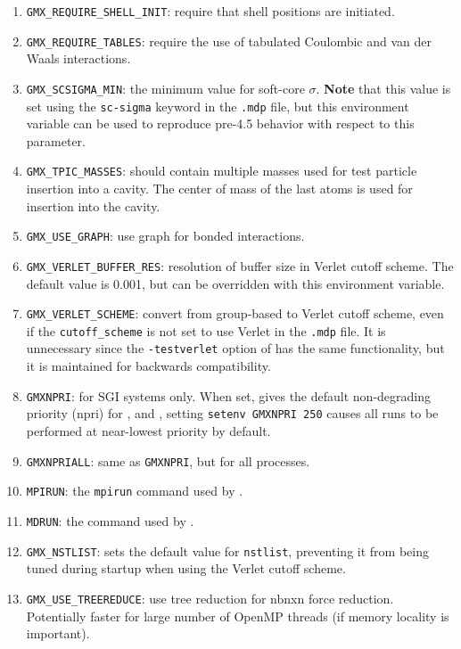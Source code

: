 \begin{enumerate}
\item   {\tt GMX_REQUIRE_SHELL_INIT}: require that shell positions are initiated.
\item   {\tt GMX_REQUIRE_TABLES}: require the use of tabulated Coulombic
        and van der Waals interactions.
\item   {\tt GMX_SCSIGMA_MIN}: the minimum value for soft-core $\sigma$. {\bf Note} that this value is set
        using the {\tt sc-sigma} keyword in the {\tt .mdp} file, but this environment variable can be used
        to reproduce pre-4.5 behavior with respect to this parameter.
\item   {\tt GMX_TPIC_MASSES}: should contain multiple masses used for test particle insertion into a cavity.
        The center of mass of the last atoms is used for insertion into the cavity.
\item   {\tt GMX_USE_GRAPH}: use graph for bonded interactions.
\item   {\tt GMX_VERLET_BUFFER_RES}: resolution of buffer size in Verlet cutoff scheme.  The default value is
        0.001, but can be overridden with this environment variable.
\item   {\tt GMX_VERLET_SCHEME}: convert from group-based to Verlet cutoff scheme, even if the {\tt cutoff_scheme} is
        not set to use Verlet in the {\tt .mdp} file. It is unnecessary since the {\tt -testverlet} option of
        {\tt {}} has the same functionality, but it is maintained for backwards compatibility.
\item   {\tt GMXNPRI}: for SGI systems only. When set, gives the default non-degrading priority (npri) 
        for {\tt {}}, {\tt {}} and {\tt {}},
        {\eg} setting {\tt setenv GMXNPRI 250} causes all runs to be performed at near-lowest priority by default.
\item   {\tt GMXNPRIALL}: same as {\tt GMXNPRI}, but for all processes.
\item   {\tt MPIRUN}: the {\tt mpirun} command used by {\tt {}}.
\item   {\tt MDRUN}: the {\tt {}} command used by {\tt {}}.
\item   {\tt GMX_NSTLIST}: sets the default value for {\tt nstlist}, preventing it from being tuned during
        {\tt {}} startup when using the Verlet cutoff scheme.
\item   {\tt GMX_USE_TREEREDUCE}: use tree reduction for nbnxn force reduction. Potentially faster for large number of 
        OpenMP threads (if memory locality is important).

\end{enumerate}

